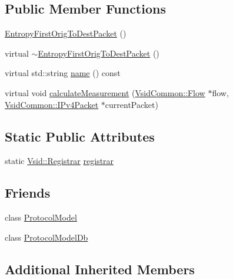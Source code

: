 \subsection*{Public Member Functions}
\begin{DoxyCompactItemize}
\item 
\hyperlink{class_vsid_1_1_entropy_first_orig_to_dest_packet_af908c4c0aca0507ce06be234cf97e488}{Entropy\-First\-Orig\-To\-Dest\-Packet} ()
\item 
virtual \hyperlink{class_vsid_1_1_entropy_first_orig_to_dest_packet_ace58f95e1383fcc69d2dff0cf604c833}{$\sim$\-Entropy\-First\-Orig\-To\-Dest\-Packet} ()
\item 
virtual std\-::string \hyperlink{class_vsid_1_1_entropy_first_orig_to_dest_packet_af720bd81b954f179ba62866b66454358}{name} () const 
\item 
virtual void \hyperlink{class_vsid_1_1_entropy_first_orig_to_dest_packet_a63a5f0ee67b9817eab71b519cc9e892f}{calculate\-Measurement} (\hyperlink{class_vsid_common_1_1_flow}{Vsid\-Common\-::\-Flow} $\ast$flow, \hyperlink{class_vsid_common_1_1_i_pv4_packet}{Vsid\-Common\-::\-I\-Pv4\-Packet} $\ast$current\-Packet)
\end{DoxyCompactItemize}
\subsection*{Static Public Attributes}
\begin{DoxyCompactItemize}
\item 
static \hyperlink{class_vsid_1_1_registrar}{Vsid\-::\-Registrar} \hyperlink{class_vsid_1_1_entropy_first_orig_to_dest_packet_a673b2b857d296aa469c0ad884059a22d}{registrar}
\end{DoxyCompactItemize}
\subsection*{Friends}
\begin{DoxyCompactItemize}
\item 
class \hyperlink{class_vsid_1_1_entropy_first_orig_to_dest_packet_a80219b863d4ff3456933d16bc5f73f45}{Protocol\-Model}
\item 
class \hyperlink{class_vsid_1_1_entropy_first_orig_to_dest_packet_a3c0d389e7a9476b06313d8fb9ca9fe68}{Protocol\-Model\-Db}
\end{DoxyCompactItemize}
\subsection*{Additional Inherited Members}


